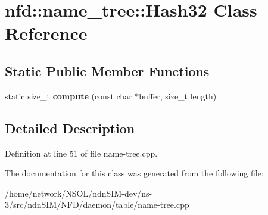 \hypertarget{classnfd_1_1name__tree_1_1Hash32}{}\section{nfd\+:\+:name\+\_\+tree\+:\+:Hash32 Class Reference}
\label{classnfd_1_1name__tree_1_1Hash32}
\subsection*{Static Public Member Functions}
\begin{DoxyCompactItemize}
\item 
static size\+\_\+t {\bfseries compute} (const char $\ast$buffer, size\+\_\+t length)\hypertarget{classnfd_1_1name__tree_1_1Hash32_aa9897d33b8b477a42534fcf2ae4864d2}{}\label{classnfd_1_1name__tree_1_1Hash32_aa9897d33b8b477a42534fcf2ae4864d2}

\end{DoxyCompactItemize}


\subsection{Detailed Description}


Definition at line 51 of file name-\/tree.\+cpp.



The documentation for this class was generated from the following file\+:\begin{DoxyCompactItemize}
\item 
/home/network/\+N\+S\+O\+L/ndn\+S\+I\+M-\/dev/ns-\/3/src/ndn\+S\+I\+M/\+N\+F\+D/daemon/table/name-\/tree.\+cpp\end{DoxyCompactItemize}
